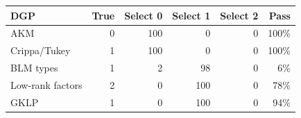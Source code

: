 \begin{tabular}{lrrrrr}
\toprule
DGP & True & Select 0 & Select 1 & Select 2 & Pass \\
\midrule
AKM & 0 & 100 & 0 & 0 & 100\% \\
Crippa/Tukey & 1 & 100 & 0 & 0 & 100\% \\
BLM types & 1 & 2 & 98 & 0 & 6\% \\
Low-rank factors & 2 & 0 & 100 & 0 & 78\% \\
GKLP & 1 & 0 & 100 & 0 & 94\% \\
\bottomrule
\end{tabular}

